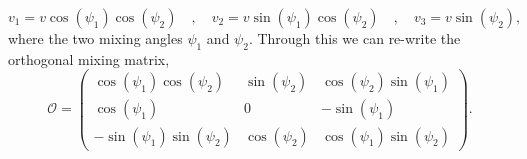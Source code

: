 \documentclass[10pt]{book}
\renewcommand{\(}{\left(}
\renewcommand{\)}{\right)}
\renewcommand{\[}{\left[}
\renewcommand{\]}{\right]}
\begin{document}
\begin{equation}
v_1 = v \cos(\psi_1) \cos(\psi_2) \quad , \quad v_2 = v \sin(\psi_1) \cos(\psi_2) \quad , \quad v_3 = v \sin(\psi_2) , 
\end{equation}
%
where the two mixing angles $\psi_1$ and $\psi_2$. 
%
Through this we can re-write the orthogonal mixing matrix, 
%
\begin{equation}
\label{eq:3HDM_Orthg}
\mathcal{O} = 
\begin{pmatrix}
\cos(\psi_1) \cos(\psi_2) & \sin(\psi_2) & \cos(\psi_2) \sin(\psi_1)   \\ 
\cos(\psi_1) & 0 & - \sin(\psi_1)  \\ 
- \sin(\psi_1) \sin(\psi_2) & \cos(\psi_2) &  \cos(\psi_1) \sin(\psi_2)
\end{pmatrix} . 
\end{equation}

%
%

%
%
%
%

%
%
%
\end{document}
